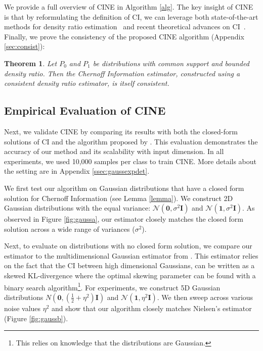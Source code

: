 \documentclass[11pt,letterpaper]{article}
\newtheorem{theorem}{Theorem}
\begin{document}


We provide a full overview of CINE in Algorithm \ref{alg}.
The key insight of CINE is that by reformulating the definition of CI, we can leverage both state-of-the-art methods for density ratio estimation~\citep{choi2022density} and recent theoretical advances on CI~\citep{nielsen2022revisiting}. Finally, we prove the consistency of the proposed CINE algorithm (Appendix \ref{sec:consist}): 





\begin{theorem}
    Let $P_0$ and $P_1$ be distributions with common support and bounded density ratio. Then the Chernoff Information estimator, constructed using a consistent density ratio estimator, is itself consistent.
\end{theorem}

 



\subsection{Empirical Evaluation of CINE}
Next, we validate CINE by comparing its results with both the closed-form solutions of CI and the algorithm proposed by \citet{nielsen2022revisiting}. This evaluation demonstrates the accuracy of our method and its scalability with input dimension. In all experiments, we used 10,000 samples per class to train CINE. More details about the setting are in Appendix \ref{ssec:gaussexpdet}. 

We first test our algorithm on Gaussian distributions that have a closed form solution for Chernoff Information (see Lemma \ref{lemma}). We construct 2D Gaussian distributions with the equal variance: $\mathcal{N}(\textbf{0},  \sigma^2\mathbf{I})$ and $\mathcal{N}(\textbf{1}, \sigma^2\mathbf{I})$. As observed in Figure \ref{fig:gaussa}, our estimator closely matches the closed form solution across a wide range of variances ($\sigma^2$).

Next, to evaluate on distributions with no closed form solution, we compare our estimator to the multidimensional Gaussian estimator from \citet{nielsen2022revisiting}. This estimator relies on the fact that the CI between high dimensional Gaussians, can be written as a skewed KL-divergence where the optimal skewing parameter can be found with a binary search algorithm\footnote{This relies on knowledge that the distributions are Gaussian.}. For experiments, we construct 5D Gaussian distributions $N(\mathbf{0}, (\frac{1}{2} +\eta^2)\mathbf{I})$ and $\mathcal{N}(\mathbf{1}, \eta^2\mathbf{I})$. We then sweep across various noise values $\eta^2$ and show that our algorithm closely matches Nielsen's estimator (Figure \ref{fig:gaussb}). 
\end{document}
